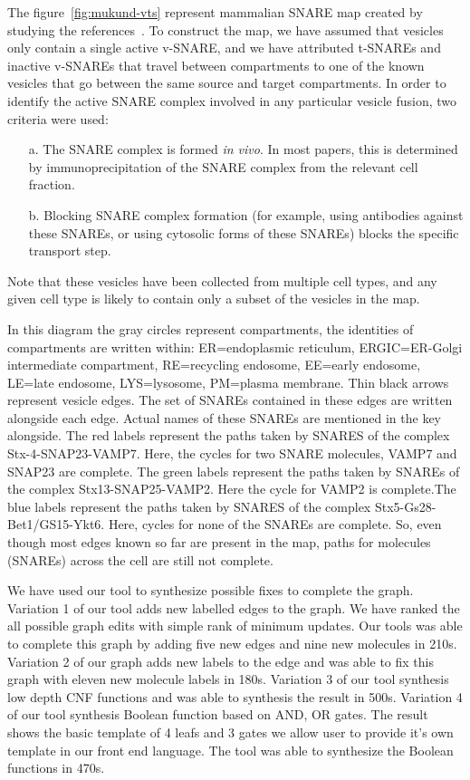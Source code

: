 The figure~\ref{fig:mukund-vts} represent mammalian SNARE map created by studying the references~\cite{somya}. 
To construct the map, we have assumed that vesicles only contain a single
active v-SNARE, and we have attributed t-SNAREs and inactive v-SNAREs that
travel between compartments to one of the known vesicles that go between
the same source and target compartments.
In order to identify the active SNARE complex involved in any particular
vesicle fusion, two criteria were used: 
\begin{enumerate}
\item[a.] The SNARE complex is formed \textit{in vivo}. In most papers, this is determined by immunoprecipitation of the SNARE complex from the relevant cell fraction. 
\item[b.] Blocking SNARE complex formation (for example, using antibodies against these SNAREs, or
using cytosolic forms of these SNAREs) blocks the specific transport step.
\end{enumerate}


Note that these vesicles have been collected from multiple cell types, and
any given cell type is likely to contain only a subset of the vesicles in
the map.

In this diagram the gray circles represent compartments, the identities of compartments are
written within: ER=endoplasmic reticulum, ERGIC=ER-Golgi intermediate compartment,
RE=recycling endosome, EE=early endosome, LE=late endosome, LYS=lysosome, PM=plasma
membrane. Thin black arrows represent vesicle edges.
The set of SNAREs contained in these edges are written alongside each edge. Actual names
of these SNAREs are mentioned in the key alongside. The red labels represent the paths taken by
SNARES of the complex Stx-4-SNAP23-VAMP7. Here, the cycles for two SNARE molecules,
VAMP7 and SNAP23 are complete. The green labels represent the paths taken by SNAREs of the
complex Stx13-SNAP25-VAMP2. Here the cycle for VAMP2 is complete.The blue labels represent
the paths taken by SNARES of the complex Stx5-Gs28-Bet1/GS15-Ykt6. Here, cycles for none of
the SNAREs are complete. So, even though most edges known so far are present in the map, paths for molecules (SNAREs) across the cell are still not complete.

We have used our tool to synthesize possible fixes to complete the graph. Variation 1 of our tool adds new labelled edges to the graph. We have ranked the all possible graph edits with simple rank of minimum updates. Our tools was able to complete this graph by adding five new edges and nine new molecules in 210s. Variation 2 of our graph adds new labels to the edge and was able to fix this graph with eleven new molecule labels in 180s. Variation 3 of our tool synthesis low depth CNF functions and was able to synthesis the result in 500s. Variation 4 of our tool synthesis Boolean function based on AND, OR gates. The result shows the basic template of 4 leafs and 3 gates we allow user to provide it's own template in our front end language. The tool was able to synthesize the Boolean functions in 470s.

